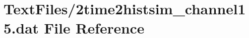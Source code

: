 \hypertarget{2time2histsim__channel15_8dat}{}\section{Text\+Files/2time2histsim\+\_\+channel15.dat File Reference}
\label{2time2histsim__channel15_8dat}

